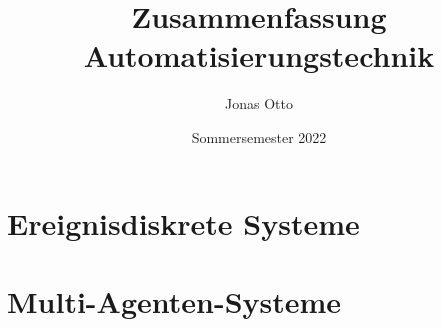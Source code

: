 \documentclass[a4paper]{book}
\title{Zusammenfassung Automatisierungstechnik}
\author{Jonas Otto}
\date{Sommersemester 2022}
\begin{document}
\maketitle
\tableofcontents

\chapter{Ereignisdiskrete Systeme}


\chapter{Multi-Agenten-Systeme}

\end{document}
